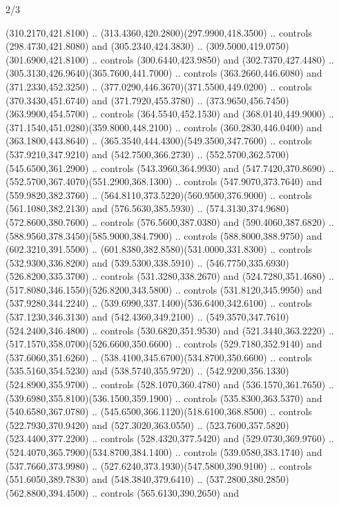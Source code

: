 \begin{flagdescription}{2/3}
\begin{scope}[xshift=0.5\flaglength,yshift=0.5\flagwidth,scale=\flagwidth/255]
\begin{scope}[y=-0.43pt, x=0.43pt,xshift=-193pt,yshift=133pt]
\begin{scope}[draw=black,line width=0.003\flagwidth]
  (310.2170,421.8100) .. (313.4360,420.2800)(297.9900,418.3500) .. controls
  (298.4730,421.8080) and (305.2340,424.3830) ..
  (309.5000,419.0750)(301.6900,421.8100) .. controls (300.6440,423.9850) and
  (302.7370,427.4480) .. (305.3130,426.9640)(365.7600,441.7000) .. controls
  (363.2660,446.6080) and (371.2330,452.3250) ..
  (377.0290,446.3670)(371.5500,449.0200) .. controls (370.3430,451.6740) and
  (371.7920,455.3780) .. (373.9650,456.7450)(363.9900,454.5700) .. controls
  (364.5540,452.1530) and (368.0140,449.9000) ..
  (371.1540,451.0280)(359.8000,448.2100) .. controls (360.2830,446.0400) and
  (363.1800,443.8640) .. (365.3540,444.4300)(549.3500,347.7600) .. controls
  (537.9210,347.9210) and (542.7500,366.2730) ..
  (552.5700,362.5700)(545.6500,361.2900) .. controls (543.3960,364.9930) and
  (547.7420,370.8690) .. (552.5700,367.4070)(551.2900,368.1300) .. controls
  (547.9070,373.7640) and (559.9820,382.3760) ..
  (564.8110,373.5220)(560.9500,376.9000) .. controls (561.1080,382.2130) and
  (576.5630,385.5930) .. (574.3130,374.9680)(572.8600,380.7600) .. controls
  (576.5600,387.0380) and (590.4060,387.6820) ..
  (588.9560,378.3450)(585.9000,384.7900) .. controls (588.8000,388.9750) and
  (602.3210,391.5500) .. (601.8380,382.8580)(531.0000,331.8300) .. controls
  (532.9300,336.8200) and (539.5300,338.5910) ..
  (546.7750,335.6930)(526.8200,335.3700) .. controls (531.3280,338.2670) and
  (524.7280,351.4680) .. (517.8080,346.1550)(526.8200,343.5800) .. controls
  (531.8120,345.9950) and (537.9280,344.2240) ..
  (539.6990,337.1400)(536.6400,342.6100) .. controls (537.1230,346.3130) and
  (542.4360,349.2100) .. (549.3570,347.7610)(524.2400,346.4800) .. controls
  (530.6820,351.9530) and (521.3440,363.2220) ..
  (517.1570,358.0700)(526.6600,350.6600) .. controls (529.7180,352.9140) and
  (537.6060,351.6260) .. (538.4100,345.6700)(534.8700,350.6600) .. controls
  (535.5160,354.5230) and (538.5740,355.9720) ..
  (542.9200,356.1330)(524.8900,355.9700) .. controls (528.1070,360.4780) and
  (536.1570,361.7650) .. (539.6980,355.8100)(536.1500,359.1900) .. controls
  (535.8300,363.5370) and (540.6580,367.0780) ..
  (545.6500,366.1120)(518.6100,368.8500) .. controls (522.7930,370.9420) and
  (527.3020,363.0550) .. (523.7600,357.5820)(523.4400,377.2200) .. controls
  (528.4320,377.5420) and (529.0730,369.9760) ..
  (524.4070,365.7900)(534.8700,384.1400) .. controls (539.0580,383.1740) and
  (537.7660,373.9980) .. (527.6240,373.1930)(547.5800,390.9100) .. controls
  (551.6050,389.7830) and (548.3840,379.6410) ..
  (537.2800,380.2850)(562.8800,394.4500) .. controls (565.6130,390.2650) and

\end{scope}
\end{scope}
\end{scope}
\end{flagdescription}
